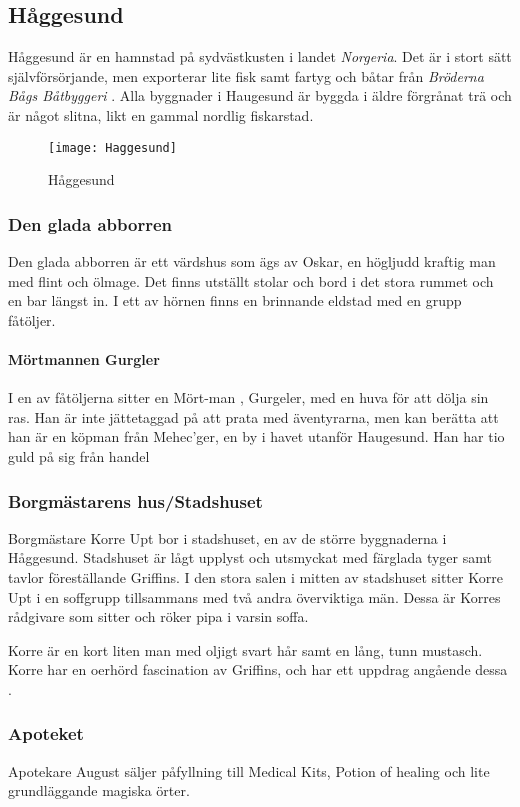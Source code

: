 \subsection{Håggesund}
\label{haggesund}
%
Håggesund är en hamnstad på sydvästkusten i landet \textit{Norgeria}. Det är i stort sätt självförsörjande, men exporterar lite fisk samt fartyg och båtar från \textit{Bröderna Bågs Båtbyggeri} \sectiondescribe{\ref{brodernaBagsBatbryggeri}}. 
Alla byggnader i Haugesund är byggda i äldre förgrånat trä och är något slitna, likt en gammal nordlig fiskarstad.
%
\begin{figure}
	\centering
	\texttt{[image: Haggesund]}
	\caption{Håggesund}
\end{figure}
%
\subsubsection{Den glada abborren}
\label{haggesund:denGladaAbborren}
Den glada abborren är ett värdshus som ägs av Oskar, en högljudd kraftig man med flint och ölmage. Det finns utställt stolar och bord i det stora rummet och en bar längst in. I ett av hörnen finns en brinnande eldstad med en grupp fåtöljer. 
%
\paragraph{Mörtmannen Gurgler}
I en av fåtöljerna sitter en Mört-man \sectiondescribe{\ref{mortman}}, Gurgeler, med en huva för att dölja sin ras. Han är inte jättetaggad på att prata med äventyrarna, men kan berätta att han är en köpman från Mehec’ger, 
en by i havet utanför Haugesund. Han har tio guld på sig från handel %
%
\subsubsection{Borgmästarens hus/Stadshuset}
Borgmästare Korre Upt bor i stadshuset, en av de större byggnaderna i Håggesund. Stadshuset är lågt upplyst och utsmyckat med färglada tyger samt tavlor föreställande Griffins. I den stora salen i mitten av stadshuset sitter Korre Upt i en soffgrupp tillsammans med två andra överviktiga män. Dessa är Korres rådgivare som sitter och röker pipa i varsin soffa.

Korre är en kort liten man med oljigt svart hår samt en lång, tunn mustasch. Korre har en oerhörd fascination av Griffins, och har ett uppdrag angående dessa \sectiondescribe{\ref{korresGriffins}}.
%
\subsubsection{Apoteket}
Apotekare August säljer påfyllning till Medical Kits, Potion of healing och lite grundläggande magiska örter.
%
